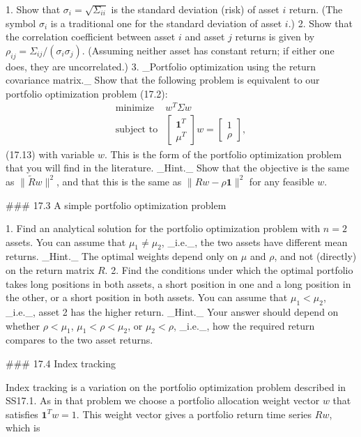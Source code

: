 1. Show that \(\sigma_{i}=\sqrt{\Sigma_{ii}}\) is the standard deviation (risk) of asset \(i\) return. (The symbol \(\sigma_{i}\) is a traditional one for the standard deviation of asset \(i\).)
2. Show that the correlation coefficient between asset \(i\) and asset \(j\) returns is given by \(\rho_{ij}=\Sigma_{ij}/(\sigma_{i}\sigma_{j})\). (Assuming neither asset has constant return; if either one does, they are uncorrelated.)
3. _Portfolio optimization using the return covariance matrix._ Show that the following problem is equivalent to our portfolio optimization problem (17.2): \[\begin{array}{ll}\mbox{minimize}&w^{T}\Sigma w\\ \mbox{subject to}&\left[\begin{array}{c}\mathbf{1}^{T}\\ \mu^{T}\end{array}\right]w=\left[\begin{array}{c}1\\ \rho\end{array}\right],\end{array}\] (17.13) with variable \(w\). This is the form of the portfolio optimization problem that you will find in the literature. _Hint._ Show that the objective is the same as \(\|\tilde{R}w\|^{2}\), and that this is the same as \(\|Rw-\rho\mathbf{1}\|^{2}\) for any feasible \(w\).

### 17.3 A simple portfolio optimization problem

1. Find an analytical solution for the portfolio optimization problem with \(n=2\) assets. You can assume that \(\mu_{1}\neq\mu_{2}\), _i.e._, the two assets have different mean returns. _Hint._ The optimal weights depend only on \(\mu\) and \(\rho\), and not (directly) on the return matrix \(R\).
2. Find the conditions under which the optimal portfolio takes long positions in both assets, a short position in one and a long position in the other, or a short position in both assets. You can assume that \(\mu_{1}<\mu_{2}\), _i.e._, asset 2 has the higher return. _Hint._ Your answer should depend on whether \(\rho<\mu_{1}\), \(\mu_{1}<\rho<\mu_{2}\), or \(\mu_{2}<\rho\), _i.e._, how the required return compares to the two asset returns.

### 17.4 Index tracking

Index tracking is a variation on the portfolio optimization problem described in SS17.1. As in that problem we choose a portfolio allocation weight vector \(w\) that satisfies \(\mathbf{1}^{T}w=1\). This weight vector gives a portfolio return time series \(Rw\), which is